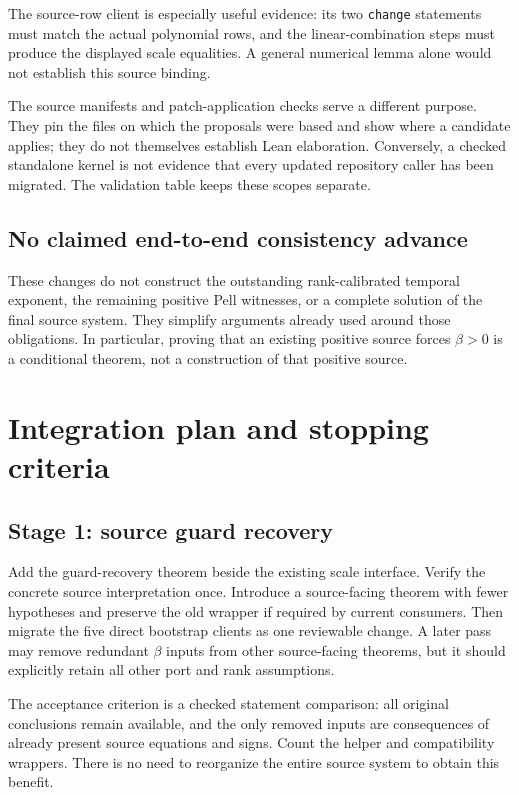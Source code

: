 \documentclass[11pt,letterpaper]{article}
\newcommand{\code}[1]{{\small\urlstyle{tt}\nolinkurl{#1}}}
\begin{document}
The source-row client is especially useful evidence: its two \code{change} statements must match the actual polynomial rows, and the linear-combination steps must produce the displayed scale equalities. A general numerical lemma alone would not establish this source binding.

The source manifests and patch-application checks serve a different purpose. They pin the files on which the proposals were based and show where a candidate applies; they do not themselves establish Lean elaboration. Conversely, a checked standalone kernel is not evidence that every updated repository caller has been migrated. The validation table keeps these scopes separate.

\subsection{No claimed end-to-end consistency advance}

These changes do not construct the outstanding rank-calibrated temporal exponent, the remaining positive Pell witnesses, or a complete solution of the final source system. They simplify arguments already used around those obligations. In particular, proving that an existing positive source forces $\beta>0$ is a conditional theorem, not a construction of that positive source.

\section{Integration plan and stopping criteria}

\subsection{Stage 1: source guard recovery}

Add the guard-recovery theorem beside the existing scale interface. Verify the concrete source interpretation once. Introduce a source-facing theorem with fewer hypotheses and preserve the old wrapper if required by current consumers. Then migrate the five direct bootstrap clients as one reviewable change. A later pass may remove redundant $\beta$ inputs from other source-facing theorems, but it should explicitly retain all other port and rank assumptions.

The acceptance criterion is a checked statement comparison: all original conclusions remain available, and the only removed inputs are consequences of already present source equations and signs. Count the helper and compatibility wrappers. There is no need to reorganize the entire source system to obtain this benefit.
\end{document}
